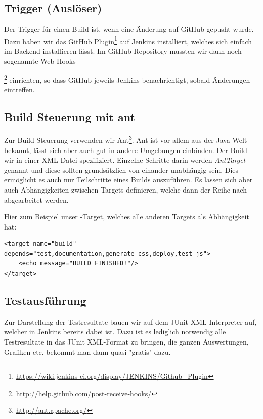 \subsection{Trigger (Auslöser)}
Der Trigger für einen Build ist, wenn eine Änderung auf GitHub gepusht wurde. Dazu haben wir das GitHub Plugin\footnote{\url{https://wiki.jenkins-ci.org/display/JENKINS/Github+Plugin}} auf Jenkins installiert, welches sich einfach im Backend installieren lässt. Im GitHub-Repository mussten wir dann noch sogenannte Web Hooks{\footnote{\url{http://help.github.com/post-receive-hooks/}} einrichten, so dass GitHub jeweils Jenkins benachrichtigt, sobald Änderungen eintreffen.

\subsection{Build Steuerung mit ant}
Zur Build-Steuerung verwenden wir Ant\footnote{\url{http://ant.apache.org/}}. Ant ist vor allem aus der Java-Welt bekannt, lässt sich aber auch gut in andere Umgebungen einbinden. Der Build wir in einer XML-Datei spezifiziert. Einzelne Schritte darin werden \emph{\gls{AntTarget}} genannt und diese sollten grundsätzlich von einander unabhängig sein. Dies ermöglicht es auch nur Teilschritte eines Builds auszuführen. Es lassen sich aber auch Abhängigkeiten zwischen Targets definieren, welche dann der Reihe nach abgearbeitet werden.

Hier zum Beispiel unser -Target, welches alle anderen Targets als Abhängigkeit hat:
\lstset{language=Ant}
\begin{lstlisting}
<target name="build" depends="test,documentation,generate_css,deploy,test-js">
	<echo message="BUILD FINISHED!"/>
</target>
\end{lstlisting}

\subsection{Testausführung}
Zur Darstellung der Testresultate bauen wir auf dem JUnit XML-Interpreter auf, welcher in Jenkins bereits dabei ist. Dazu ist es lediglich notwendig alle Testresultate in das JUnit XML-Format zu bringen, die ganzen Auswertungen, Grafiken etc. bekommt man dann quasi "gratis" dazu.

}
